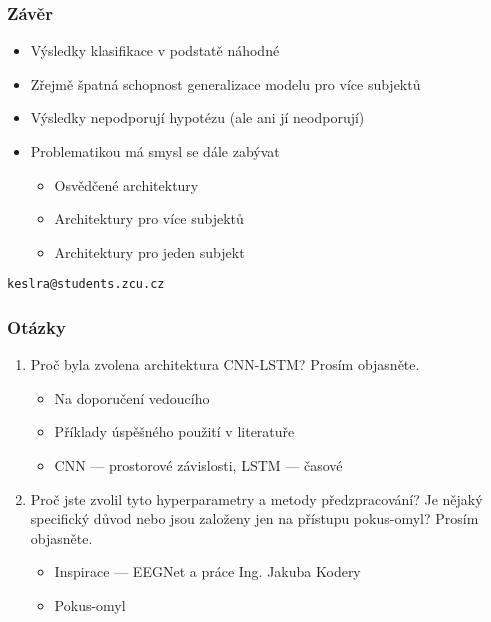 \documentclass{beamer}
\begin{document}
\begin{frame}
	\frametitle{Závěr}
	\begin{itemize}
		\item Výsledky klasifikace v podstatě náhodné
		\item Zřejmě špatná schopnost generalizace modelu pro více subjektů
		\item Výsledky nepodporují hypotézu (ale ani jí neodporují)
		\item Problematikou má smysl se dále zabývat
		      \begin{itemize}
			      \item Osvědčené architektury
			      \item Architektury pro více subjektů
			      \item Architektury pro jeden subjekt
		      \end{itemize}
	\end{itemize}
\end{frame}

\begin{frame}
	\centering
	\huge
	\texttt{keslra@students.zcu.cz}
\end{frame}

\begin{frame}
	\frametitle{Otázky}
	\begin{enumerate}
		\item Proč byla zvolena architektura CNN-LSTM? Prosím objasněte.
		      \begin{itemize}
			      \item Na doporučení vedoucího
			      \item Příklady úspěšného použití v literatuře
			      \item CNN --- prostorové závislosti, LSTM --- časové
		      \end{itemize}
		\item Proč jste zvolil tyto hyperparametry a metody předzpracování? Je nějaký specifický důvod nebo jsou založeny jen na přístupu pokus-omyl? Prosím objasněte.
		      \begin{itemize}
			      \item Inspirace --- EEGNet a práce Ing. Jakuba Kodery
			      \item Pokus-omyl
		      \end{itemize}
	\end{enumerate}

\end{frame}
\end{document}
